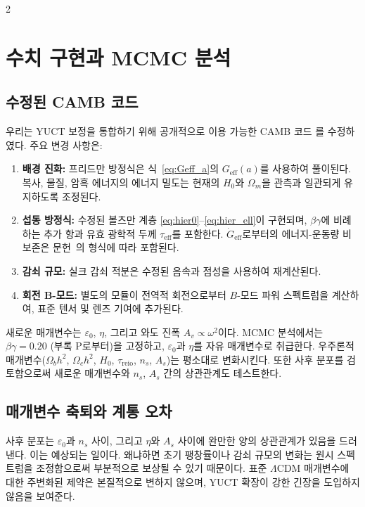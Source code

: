 \documentclass[11pt,a4paper]{article}
\begin{document}
	\begin{multicols}{2}
		
		\section{수치 구현과 MCMC 분석}
		
		\subsection{수정된 CAMB 코드}
		
		우리는 YUCT 보정을 통합하기 위해 공개적으로 이용 가능한 CAMB 코드 \cite{Lewis2000}를 수정하였다. 주요 변경 사항은:
		\begin{enumerate}
			\item \textbf{배경 진화:} 프리드만 방정식은 식~\eqref{eq:Geff_a}의 $G_{\mathrm{eff}}(a)$를 사용하여 풀이된다. 복사, 물질, 암흑 에너지의 에너지 밀도는 현재의 $H_0$와 $\Omega_m$을 관측과 일관되게 유지하도록 조정된다.
			\item \textbf{섭동 방정식:} 수정된 볼츠만 계층 \eqref{eq:hier0}--\eqref{eq:hier_ell}이 구현되며, $\beta\gamma$에 비례하는 추가 항과 유효 광학적 두께 $\tau_{\mathrm{eff}}$를 포함한다. $\dot{G}_{\mathrm{eff}}$로부터의 에너지-운동량 비보존은 문헌~\cite{Uzan2011}의 형식에 따라 포함된다.
			\item \textbf{감쇠 규모:} 실크 감쇠 적분은 수정된 음속과 점성을 사용하여 재계산된다.
			\item \textbf{회전 B-모드:} 별도의 모듈이 전역적 회전으로부터 $B$-모드 파워 스펙트럼을 계산하여, 표준 텐서 및 렌즈 기여에 추가된다.
		\end{enumerate}
		새로운 매개변수는 $\varepsilon_0$, $\eta$, 그리고 와도 진폭 $A_v \propto \omega^2$이다. MCMC 분석에서는 $\beta\gamma = 0.20$ (부록 P로부터)을 고정하고, $\varepsilon_0$과 $\eta$를 자유 매개변수로 취급한다. 우주론적 매개변수($\Omega_b h^2$, $\Omega_c h^2$, $H_0$, $\tau_{\mathrm{reio}}$, $n_s$, $A_s$)는 평소대로 변화시킨다. 또한 사후 분포를 검토함으로써 새로운 매개변수와 $n_s$, $A_s$ 간의 상관관계도 테스트한다.
		
		\subsection{매개변수 축퇴와 계통 오차}
		
		사후 분포는 $\varepsilon_0$과 $n_s$ 사이, 그리고 $\eta$와 $A_s$ 사이에 완만한 양의 상관관계가 있음을 드러낸다. 이는 예상되는 일이다. 왜냐하면 초기 팽창률이나 감쇠 규모의 변화는 원시 스펙트럼을 조정함으로써 부분적으로 보상될 수 있기 때문이다. 표준 $\Lambda$CDM 매개변수에 대한 주변화된 제약은 본질적으로 변하지 않으며, YUCT 확장이 강한 긴장을 도입하지 않음을 보여준다.
		

\end{multicols}
\end{document}
